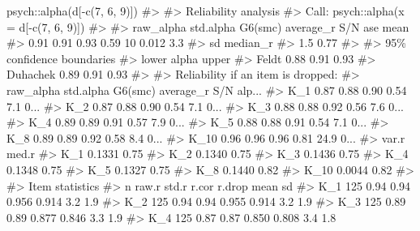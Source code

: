\documentclass[
  letterpaper,
]{krantz}
\makeatletter
\newenvironment{Shaded}{\begin{snugshade}}{\end{snugshade}}
\newcommand{\CommentTok}[1]{\textcolor[rgb]{0.37,0.37,0.37}{#1}}
\newcommand{\DecValTok}[1]{\textcolor[rgb]{0.68,0.00,0.00}{#1}}
\newcommand{\FunctionTok}[1]{\textcolor[rgb]{0.28,0.35,0.67}{#1}}
\newcommand{\NormalTok}[1]{\textcolor[rgb]{0.00,0.23,0.31}{#1}}
\newcommand{\SpecialCharTok}[1]{\textcolor[rgb]{0.37,0.37,0.37}{#1}}
\newenvironment{kframe}{%
\medskip{}
\setlength{\fboxsep}{.8em}
 \def\at@end@of@kframe{}%
 \ifinner\ifhmode%
  \def\at@end@of@kframe{\end{minipage}}%
  \begin{minipage}{\columnwidth}%
 \fi\fi%
 \def\FrameCommand##1{\hskip\@totalleftmargin \hskip-\fboxsep
 \colorbox{shadecolor}{##1}\hskip-\fboxsep
     \hskip-\linewidth \hskip-\@totalleftmargin \hskip\columnwidth}%
 \MakeFramed {\advance\hsize-\width
   \@totalleftmargin\z@ \linewidth\hsize
   \@setminipage}}%
 {\par\unskip\endMakeFramed%
 \at@end@of@kframe}
\renewenvironment{Shaded}{\begin{kframe}}{\end{kframe}}
\makeatother
\begin{document}
\begin{Shaded}
\begin{Highlighting}[]
\NormalTok{psych}\SpecialCharTok{::}\FunctionTok{alpha}\NormalTok{(d[}\SpecialCharTok{{-}}\FunctionTok{c}\NormalTok{(}\DecValTok{7}\NormalTok{, }\DecValTok{6}\NormalTok{, }\DecValTok{9}\NormalTok{)])}
\CommentTok{\#\textgreater{} }
\CommentTok{\#\textgreater{} Reliability analysis   }
\CommentTok{\#\textgreater{} Call: psych::alpha(x = d[{-}c(7, 6, 9)])}
\CommentTok{\#\textgreater{} }
\CommentTok{\#\textgreater{}   raw\_alpha std.alpha G6(smc) average\_r S/N   ase mean}
\CommentTok{\#\textgreater{}       0.91      0.91    0.93      0.59  10 0.012  3.3}
\CommentTok{\#\textgreater{}   sd median\_r}
\CommentTok{\#\textgreater{}  1.5     0.77}
\CommentTok{\#\textgreater{} }
\CommentTok{\#\textgreater{}     95\% confidence boundaries }
\CommentTok{\#\textgreater{}          lower alpha upper}
\CommentTok{\#\textgreater{} Feldt     0.88  0.91  0.93}
\CommentTok{\#\textgreater{} Duhachek  0.89  0.91  0.93}
\CommentTok{\#\textgreater{} }
\CommentTok{\#\textgreater{}  Reliability if an item is dropped:}
\CommentTok{\#\textgreater{}      raw\_alpha std.alpha G6(smc) average\_r  S/N alp...}
\CommentTok{\#\textgreater{} K\_1       0.87      0.88    0.90      0.54  7.1   0...}
\CommentTok{\#\textgreater{} K\_2       0.87      0.88    0.90      0.54  7.1   0...}
\CommentTok{\#\textgreater{} K\_3       0.88      0.88    0.92      0.56  7.6   0...}
\CommentTok{\#\textgreater{} K\_4       0.89      0.89    0.91      0.57  7.9   0...}
\CommentTok{\#\textgreater{} K\_5       0.88      0.88    0.91      0.54  7.1   0...}
\CommentTok{\#\textgreater{} K\_8       0.89      0.89    0.92      0.58  8.4   0...}
\CommentTok{\#\textgreater{} K\_10      0.96      0.96    0.96      0.81 24.9   0...}
\CommentTok{\#\textgreater{}       var.r med.r}
\CommentTok{\#\textgreater{} K\_1  0.1331  0.75}
\CommentTok{\#\textgreater{} K\_2  0.1340  0.75}
\CommentTok{\#\textgreater{} K\_3  0.1436  0.75}
\CommentTok{\#\textgreater{} K\_4  0.1348  0.75}
\CommentTok{\#\textgreater{} K\_5  0.1327  0.75}
\CommentTok{\#\textgreater{} K\_8  0.1440  0.82}
\CommentTok{\#\textgreater{} K\_10 0.0044  0.82}
\CommentTok{\#\textgreater{} }
\CommentTok{\#\textgreater{}  Item statistics }
\CommentTok{\#\textgreater{}        n raw.r std.r r.cor r.drop mean  sd}
\CommentTok{\#\textgreater{} K\_1  125  0.94  0.94 0.956  0.914  3.2 1.9}
\CommentTok{\#\textgreater{} K\_2  125  0.94  0.94 0.955  0.914  3.2 1.9}
\CommentTok{\#\textgreater{} K\_3  125  0.89  0.89 0.877  0.846  3.3 1.9}
\CommentTok{\#\textgreater{} K\_4  125  0.87  0.87 0.850  0.808  3.4 1.8}

\end{Highlighting}
\end{Shaded}
\end{document}
